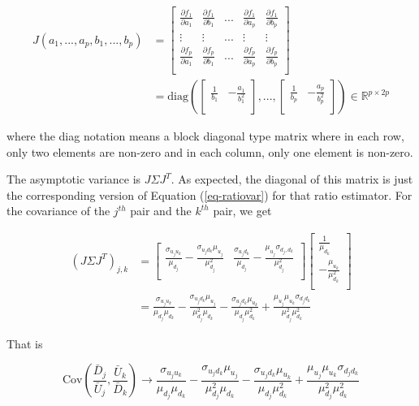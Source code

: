 \documentclass{article}
\newcommand{\Cov}{\mbox{Cov}}
\theoremstyle{definition}
\begin{document}
\begin{align*} 
J(a_1,...,a_p,b_1,...,b_p) &= \begin{bmatrix}
\frac{\partial f_1 }{\partial a_1} & \frac{\partial f_1 }{\partial b_1} & ... &  \frac{\partial f_1 }{\partial a_p}&  \frac{\partial f_1 }{\partial b_p}\\
\vdots  & \vdots &  ... & \vdots & \vdots  \\
\frac{\partial f_p }{\partial a_1} & \frac{\partial f_p }{\partial b_1} & ... &  \frac{\partial f_p }{\partial a_p}   & \frac{\partial f_p }{\partial b_p}\\
\end{bmatrix} \\ 
&= \text{diag}\left(\begin{bmatrix}
\frac{1}{b_1} & -\frac{a_1}{b_1^2} \\ 
\end{bmatrix},...,\begin{bmatrix}
\frac{1}{b_p} & -\frac{a_p}{b_p^2} \\ 
\end{bmatrix} \right) \in \mathbb{R}^{p\times 2p}
\end{align*}  

where the diag notation means a block diagonal type matrix where in each row, only two elements are non-zero and in each column, only one element is non-zero. 

The asymptotic variance is $J\Sigma J^T$. As expected, the diagonal of this matrix is just the corresponding version of Equation (\ref{eq-ratiovar}) for that ratio estimator. For the covariance of the $j^{th}$ pair and the $k^{th}$ pair, we get

\begin{align*}
(J\Sigma J^T)_{j,k} &= 
    \begin{bmatrix}
  \frac{\sigma_{u_ju_k}}{\mu_{d_j}} - \frac{\sigma_{u_jd_k}\mu_{u_j}}{\mu_{d_j}^2}  & \frac{\sigma_{u_jd_k}}{\mu_{d_j}} - \frac{\mu_{u_j}\sigma_{d_j,d_k}}{\mu_{d_j}^2} \\
\end{bmatrix} \begin{bmatrix}
   \frac{1}{\mu_{d_k}} \\ 
    -\frac{\mu_{u_k}}{\mu_{d_k}^2} \\ 
\end{bmatrix}\\ 
&= \frac{\sigma_{u_ju_k}}{\mu_{d_j}\mu_{d_k}} - \frac{\sigma_{u_jd_k}\mu_{u_j}}{\mu^2_{d_j}\mu_{d_k}} - \frac{\sigma_{u_jd_k}\mu_{u_k}}{\mu_{d_j}\mu_{d_k}^2}  + \frac{\mu_{u_j}\mu_{u_k}\sigma_{d_jd_k}}{\mu_{d_j}^2\mu_{d_k}^2}
\end{align*}

That is 

\begin{equation*}
    \Cov\left(\frac{\bar{D}_j}{\bar{U}_j}, \frac{\bar{U}_k}{\bar{D}_k}\right) \rightarrow \frac{\sigma_{u_ju_k}}{\mu_{d_j}\mu_{d_k}} - \frac{\sigma_{u_jd_k}\mu_{u_j}}{\mu^2_{d_j}\mu_{d_k}} - \frac{\sigma_{u_jd_k}\mu_{u_k}}{\mu_{d_j}\mu_{d_k}^2}  + \frac{\mu_{u_j}\mu_{u_k}\sigma_{d_jd_k}}{\mu_{d_j}^2\mu_{d_k}^2}
\end{equation*}
\end{document}
